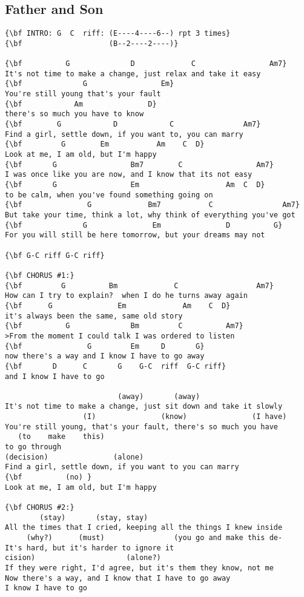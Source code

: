 \documentclass[a4paper]{article}
\begin{document}
\subsection{Father and Son} %
\label{sub:Father and So}
\begin{Verbatim}[commandchars=\\\{\}]
{\bf INTRO: G  C  riff: (E----4----6--) rpt 3 times}
{\bf                    (B--2----2----)}

{\bf          G              D             C                 Am7}
It's not time to make a change, just relax and take it easy
{\bf              G                 Em}
You're still young that's your fault
{\bf            Am               D}
there's so much you have to know
{\bf        G            D            C                Am7}
Find a girl, settle down, if you want to, you can marry
{\bf         G        Em           Am    C  D}
Look at me, I am old, but I'm happy
{\bf       G                 Bm7        C                 Am7}
I was once like you are now, and I know that its not easy
{\bf       G                 Em                    Am  C  D}
to be calm, when you've found something going on
{\bf               G             Bm7           C                Am7}
But take your time, think a lot, why think of everything you've got
{\bf              G               Em               D          G}
For you will still be here tomorrow, but your dreams may not

{\bf G-C riff G-C riff}

{\bf CHORUS #1:}
{\bf         G          Bm             C                  Am7}
How can I try to explain?  when I do he turns away again
{\bf      G               Em             Am    C  D}
it's always been the same, same old story
{\bf          G              Bm         C          Am7}
>From the moment I could talk I was ordered to listen
{\bf               G         Em     D       G}
now there's a way and I know I have to go away
{\bf       D      C       G    G-C  riff  G-C riff}
and I know I have to go

                          (away)       (away)
It's not time to make a change, just sit down and take it slowly
                  (I)               (know)               (I have)
You're still young, that's your fault, there's so much you have
   (to    make    this)
to go through
(decision)               (alone)
Find a girl, settle down, if you want to you can marry
{\bf          (no) }
Look at me, I am old, but I'm happy

{\bf CHORUS #2:}
        (stay)       (stay, stay)
All the times that I cried, keeping all the things I knew inside
     (why?)      (must)                (you go and make this de-
It's hard, but it's harder to ignore it
cision)                     (alone?)
If they were right, I'd agree, but it's them they know, not me
Now there's a way, and I know that I have to go away
I know I have to go
\end{Verbatim}
\newpage
\end{document}
